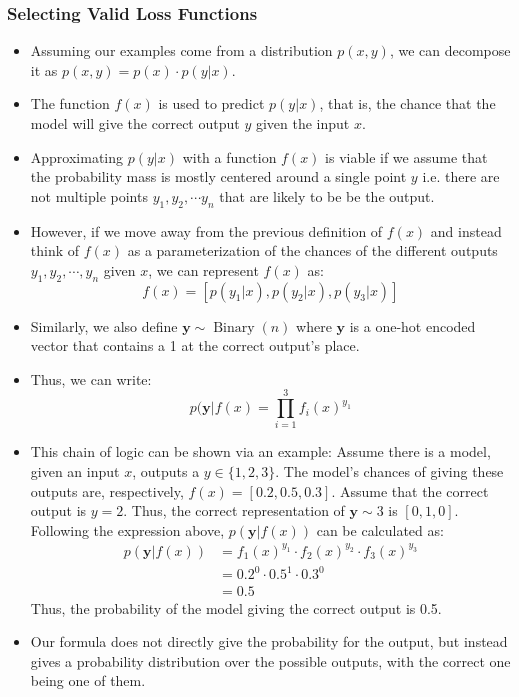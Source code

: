 \documentclass{article}
\newcommand{\mbf}[1]{\mathbf{#1}}
\begin{document}
\subsubsection{Selecting Valid Loss Functions}

\begin{itemize}
    \item Assuming our examples come from a distribution $p(x,y)$, we can decompose it as $p(x,y) = p(x) \cdot p(y | x)$.
    \item The function $f(x)$ is used to predict $p(y|x)$, that is, the chance that the model will give the correct output $y$ given the input $x$.
    \item Approximating $p(y|x)$ with a function $f(x)$ is viable if we assume that the probability mass is mostly centered
    around a single point $y$ i.e. there are not multiple points $y_1, y_2, \cdots y_n$ that are likely to be be the output.
    \item However, if we move away from the previous definition of $f(x)$ and instead think of $f(x)$ as
    a parameterization of the chances of the different outputs $y_1, y_2, \cdots, y_n$ given $x$, we can represent $f(x)$ as:
    \[f(x) = [p(y_1 | x) , p(y_2 | x), p(y_3 | x)]\]
    \item Similarly, we also define $\mbf{y} \sim \operatorname{Binary}(n)$ where $\mbf{y}$ is a one-hot encoded vector that contains a 1 at the correct output's place.
    \item Thus, we can write: 
    \[p(\mbf{y} | f(x) = \prod^3_{i = 1}f_i(x)^{y_1}\]
    \item This chain of logic can be shown via an example:
    Assume there is a model, given an input $x$, outputs a $y \in \{1,2,3\}$. The model's chances of giving these outputs are, respectively, $f(x) = [0.2, 0.5, 0.3]$.
    Assume that the correct output is $y = 2$. Thus, the correct representation of $\mbf{y} \sim 3$ is $[0,1,0]$.
    Following the expression above, $p(\mbf{y} | f(x))$ can be calculated as:
    \begin{align*}
        p(\mbf{y} | f(x)) &= f_1(x)^{y_1} \cdot f_2(x)^{y_2} \cdot f_3(x)^{y_3} \\
        &= 0.2^0 \cdot 0.5^1 \cdot 0.3^0 \\
        &= 0.5 
    \end{align*}
    Thus, the probability of the model giving the correct output is 0.5.

    \item Our formula does not directly give the probability for the output, but instead gives a probability distribution over the possible outputs, with the correct one being one of them.
\end{itemize}
\end{document}
